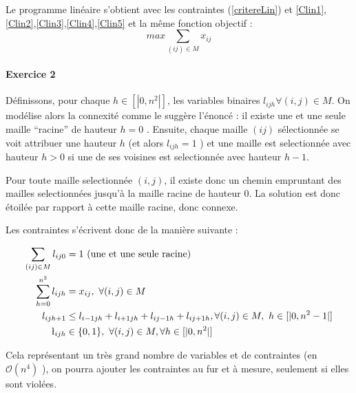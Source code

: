 \documentclass[12pt,a4paper]{article}
\begin{document}
Le programme linéaire s'obtient avec les contraintes (\ref{critereLin}) et \ref{Clin1}, \ref{Clin2},\ref{Clin3},\ref{Clin4},\ref{Clin5} et la même fonction objectif : $$max \sum_{(ij)\in M} x_{ij}$$

\vspace{1cm}


\paragraph{Exercice 2\\}

Définissons, pour chaque $h\in [| 0,n^2 |] $, les variables binaires $ l_{ijh} \forall (i,j) \in M$.
On modélise alors la connexité comme le suggère l'énoncé : il existe une et une seule maille ``racine''  de hauteur $h=0$ . Ensuite, chaque maille $(ij)$ sélectionnée se voit attribuer une hauteur $h$ (et alors $l_{ijh}=1$ ) et une maille est selectionnée avec hauteur $h>0$ si une de ses voisines est selectionnée avec hauteur $h-1$.

Pour toute maille selectionnée $(i,j)$, il existe donc un chemin empruntant des mailles selectionnées jusqu'à la maille racine de hauteur 0. La solution est donc étoilée par rapport à cette maille racine, donc connexe.

Les contraintes s'écrivent donc de la manière suivante : 

\begin{align} \label{Cconnex}
\sum_{(ij)\in M} l_{ij0} &= 1 \ \text{(une et une seule racine)} \\
\sum_{h=0}^{n^2} l_{ijh} &= x_{ij} , \ \forall (i,j) \in M \\
l_{ijh+1} & \leq l_{i-1jh} +l_{i+1jh} +l_{ij-1h} +l_{ij+1h}, \forall (i,j) \in M, \ h\in [|0, n^2 -1|] \\
\l_{ijh} & \in \{0,1\} , \ \forall (i,j) \in M, \forall h\in [|0, n^2|] 
\end{align}

Cela représentant un très grand nombre de variables et de contraintes (en $\mathcal{O}(n^4) $ ), on pourra ajouter les contraintes au fur et à mesure, seulement si elles sont violées.
\end{document}
